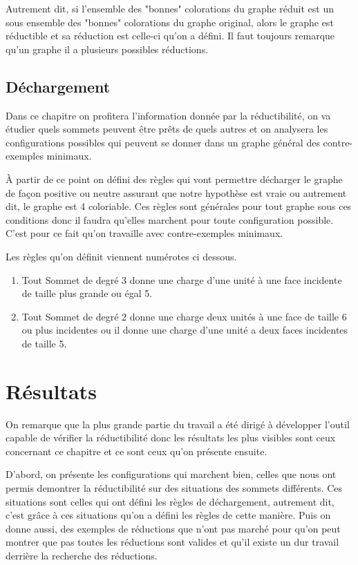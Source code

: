 \documentclass[10pt,a4paper]{article}
\begin{document}
Autrement dit, si l'ensemble des "bonnes" colorations du graphe réduit est un sous ensemble des "bonnes" colorations du graphe original, alors le graphe est réductible et sa réduction est celle-ci qu'on a défini. Il faut toujours remarque qu'un graphe il a plusieurs possibles réductions. 

\subsection{Déchargement}

Dans ce chapitre on profitera l'information donnée par la réductibilité, on va étudier quels sommets peuvent être prêts de quels autres et on analysera les configurations possibles qui peuvent se donner dans un graphe général des contre-exemples minimaux. 

À partir de ce point on défini des règles qui vont permettre décharger le graphe de façon positive ou neutre assurant que notre hypothèse est vraie ou autrement dit, le graphe est 4 coloriable. Ces règles sont générales pour tout graphe sous ces conditions donc il faudra qu'elles marchent pour toute configuration possible. C'est pour ce fait qu'on travaille avec contre-exemples minimaux. 

Les règles qu'on définit viennent numérotes ci dessous.

\begin{enumerate}
\item Tout Sommet de degré 3 donne une charge d'une unité à une face incidente de taille plus grande ou égal 5.
\item Tout Sommet de degré 2 donne une charge deux unités à une face de taille 6 ou plus incidentes ou il donne une charge d'une unité a deux faces incidentes de taille 5.
\end{enumerate} 


\section{Résultats}
On remarque que la plus grande partie du travail a été dirigé à développer l'outil capable de vérifier la réductibilité donc les résultats les plus visibles sont ceux concernant ce chapitre et ce sont ceux qu'on présente ensuite.

D'abord, on présente les configurations qui marchent bien, celles que nous ont permis demontrer la réductibilité sur des situations des sommets différents. Ces situations sont celles qui ont défini les règles de déchargement, autrement dit, c'est grâce à ces situations qu'on a défini les règles de cette manière. Puis on donne aussi, des exemples de réductions que n'ont pas marché pour qu'on peut montrer que pas toutes les réductions sont valides et qu'il existe un dur travail derrière la recherche des réductions. 
 
\end{document}
